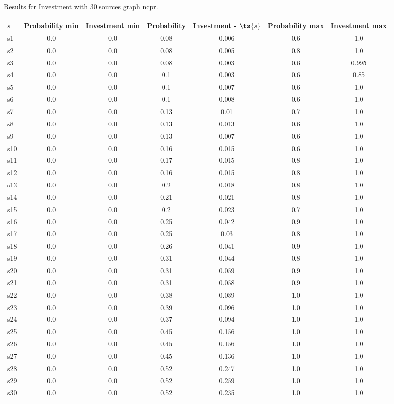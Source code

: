 \documentclass{article}
\begin{document}
\noindent Results for Investment with 30 sources graph ncpr.

\noindent\begin{tabular}{|l|c|c|c|c|c|c|}
\hline
$s$& Probability min & Investment min & Probability & Investment - $\ts{s}$ & Probability max & Investment max\\
\hline
s1 &0.0 & 0.0 & 0.08 & 0.006 & 0.6 & 1.0\\
\hline
s2 &0.0 & 0.0 & 0.08 & 0.005 & 0.8 & 1.0\\
\hline
s3 &0.0 & 0.0 & 0.08 & 0.003 & 0.6 & 0.995\\
\hline
s4 &0.0 & 0.0 & 0.1 & 0.003 & 0.6 & 0.85\\
\hline
s5 &0.0 & 0.0 & 0.1 & 0.007 & 0.6 & 1.0\\
\hline
s6 &0.0 & 0.0 & 0.1 & 0.008 & 0.6 & 1.0\\
\hline
s7 &0.0 & 0.0 & 0.13 & 0.01 & 0.7 & 1.0\\
\hline
s8 &0.0 & 0.0 & 0.13 & 0.013 & 0.6 & 1.0\\
\hline
s9 &0.0 & 0.0 & 0.13 & 0.007 & 0.6 & 1.0\\
\hline
s10 &0.0 & 0.0 & 0.16 & 0.015 & 0.6 & 1.0\\
\hline
s11 &0.0 & 0.0 & 0.17 & 0.015 & 0.8 & 1.0\\
\hline
s12 &0.0 & 0.0 & 0.16 & 0.015 & 0.8 & 1.0\\
\hline
s13 &0.0 & 0.0 & 0.2 & 0.018 & 0.8 & 1.0\\
\hline
s14 &0.0 & 0.0 & 0.21 & 0.021 & 0.8 & 1.0\\
\hline
s15 &0.0 & 0.0 & 0.2 & 0.023 & 0.7 & 1.0\\
\hline
s16 &0.0 & 0.0 & 0.25 & 0.042 & 0.9 & 1.0\\
\hline
s17 &0.0 & 0.0 & 0.25 & 0.03 & 0.8 & 1.0\\
\hline
s18 &0.0 & 0.0 & 0.26 & 0.041 & 0.9 & 1.0\\
\hline
s19 &0.0 & 0.0 & 0.31 & 0.044 & 0.8 & 1.0\\
\hline
s20 &0.0 & 0.0 & 0.31 & 0.059 & 0.9 & 1.0\\
\hline
s21 &0.0 & 0.0 & 0.31 & 0.058 & 0.9 & 1.0\\
\hline
s22 &0.0 & 0.0 & 0.38 & 0.089 & 1.0 & 1.0\\
\hline
s23 &0.0 & 0.0 & 0.39 & 0.096 & 1.0 & 1.0\\
\hline
s24 &0.0 & 0.0 & 0.37 & 0.094 & 1.0 & 1.0\\
\hline
s25 &0.0 & 0.0 & 0.45 & 0.156 & 1.0 & 1.0\\
\hline
s26 &0.0 & 0.0 & 0.45 & 0.156 & 1.0 & 1.0\\
\hline
s27 &0.0 & 0.0 & 0.45 & 0.136 & 1.0 & 1.0\\
\hline
s28 &0.0 & 0.0 & 0.52 & 0.247 & 1.0 & 1.0\\
\hline
s29 &0.0 & 0.0 & 0.52 & 0.259 & 1.0 & 1.0\\
\hline
s30 &0.0 & 0.0 & 0.52 & 0.235 & 1.0 & 1.0\\
\hline
\end{tabular}\\
\end{document}
